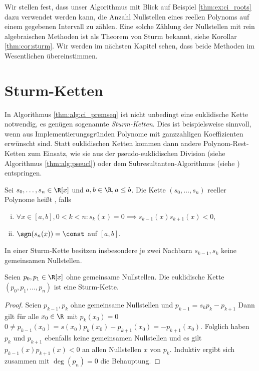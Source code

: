 \documentclass{mythesis}
\begin{document}
Wir stellen fest, dass unser Algorithmus mit Blick auf Beispiel \ref{thm:ex:ci_roots} dazu verwendet werden kann, die Anzahl Nullstellen eines reellen Polynoms auf einem gegebenen Intervall zu zählen.
Eine solche Zählung der Nullstellen mit rein algebraischen Methoden ist als Theorem von Sturm bekannt, siehe Korollar \ref{thm:cor:sturm}.
Wir werden im nächsten Kapitel sehen, dass beide Methoden im Wesentlichen übereinstimmen.

\section{Sturm-Ketten}

In Algorithmus \ref{thm:alg:ci_premseq} ist nicht unbedingt eine euklidische Kette notwendig, es genügen sogenannte \emph{Sturm-Ketten}.
Dies ist beispielsweise sinnvoll, wenn aus Implementierungsgründen Polynome mit ganzzahligen Koeffizienten erwünscht sind.
Statt euklidischen Ketten kommen dann andere Polynom-Rest-Ketten zum Einsatz, wie sie aus der pseudo-euklidischen Division (siehe Algorithmus \ref{thm:alg:pseucl}) oder dem Subresultanten-Algorithmus (siehe \cite[§3.5]{yap2000fundamental}) entspringen.

\begin{definition}
    Sei $s_0, \dotsc, s_n \in \R[x]$ und $a,b \in \R, a \le b$.
    Die Kette $(s_0, \dotsc, s_n)$ reeller Polynome heißt , falls
    \begin{enumerate}[i)]
        \item
            $\forall x \in [a,b], 0 < k < n: s_k(x) = 0 \implies s_{k-1}(x) s_{k+1}(x) < 0$,
        \item
            $\sgn(s_n(x)) = \const$ auf $[a,b]$.
    \end{enumerate}
    \begin{note}
        In einer Sturm-Kette besitzen insbesondere je zwei Nachbarn $s_{k-1}, s_k$ keine gemeinsamen Nullstellen.
    \end{note}
\end{definition}

\begin{example}
    Seien $p_0, p_1 \in \R[x]$ ohne gemeinsame Nullstellen.
    Die euklidische Kette $(p_0, p_1, \dotsc, p_n)$ ist eine Sturm-Kette.
    \begin{proof}
        Seien $p_{k-1}, p_k$ ohne gemeinsame Nullstellen und $p_{k-1} = s_k p_k - p_{k+1}$
        Dann gilt für alle $x_0 \in \R$ mit $p_k(x_0) = 0$
        \begin{math}
            0 \neq p_{k-1}(x_0)
            = s(x_0) p_k(x_0) - p_{k+1}(x_0)
            = - p_{k+1}(x_0).
        \end{math}
        Folglich haben $p_k$ und $p_{k+1}$ ebenfalls keine gemeinsamen Nullstellen und es gilt $p_{k-1}(x) p_{k+1}(x) < 0$ an allen Nullstellen $x$ von $p_k$.
        Induktiv ergibt sich zusammen mit $\deg(p_n) = 0$ die Behauptung.
    \end{proof}
\end{example}
\end{document}
